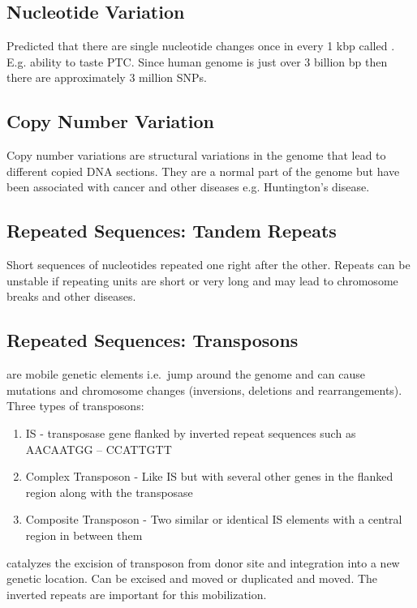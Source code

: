 \documentclass[../Bio_chemistryReview.tex]{subfiles}
\begin{document}
\subsection{Nucleotide Variation}

Predicted that there are single nucleotide changes once in every 1 kbp called
. E.g. ability to taste PTC. Since
human genome is just over 3 billion bp then there are approximately 3 million
SNPs.

\subsection{Copy Number Variation}

Copy number variations are structural variations in the genome that lead to
different copied DNA sections. They are a normal part of the genome but have
been associated with cancer and other diseases e.g. Huntington's disease.

\subsection{Repeated Sequences: Tandem Repeats}

Short sequences of nucleotides repeated one right after the other. Repeats can
be unstable if repeating units are short or very long and may lead to chromosome
breaks and other diseases.

\subsection{Repeated Sequences: Transposons}

 are mobile genetic elements i.e.\ jump around the genome and
can cause mutations and chromosome changes (inversions, deletions and
rearrangements). Three types of transposons: 
\begin{enumerate}
  \item IS - transposase gene flanked by inverted repeat sequences such as
    AACAATGG  --  CCATTGTT 
  \item Complex Transposon - Like IS but with several other genes in the flanked
    region along with the transposase
  \item Composite Transposon - Two similar or identical IS elements with a
    central region in between them 
\end{enumerate}

 catalyzes the excision of transposon from donor site and
integration into a new genetic location. Can be excised and moved or duplicated
and moved. The inverted repeats are important for this mobilization.
\end{document}
